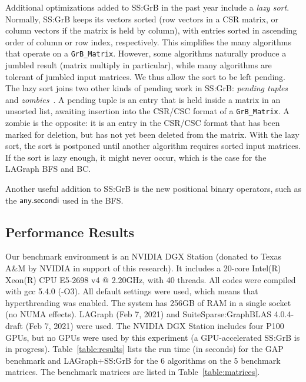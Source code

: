 Additional optimizations added to SS:GrB in the past year include a {\em lazy
sort}.  Normally, SS:GrB keeps its vectors sorted (row vectors in a CSR matrix,
or column vectors if the matrix is held by column), with entries sorted in
ascending order of column or row index, respectively.  This simplifies the many
algorithms that operate on a \verb'GrB_Matrix'.  However, some algorithms
naturally produce a jumbled result (matrix multiply in particular), while many
algorithms are tolerant of jumbled input matrices.  We thus allow the sort to
be left pending.  The lazy sort joins two other kinds of pending work in
SS:GrB: {\em pending tuples} and {\em zombies}~\cite{DBLP:journals/toms/Davis19}.
A pending tuple is an entry
that is held inside a matrix in an unsorted list, awaiting insertion into the
CSR/CSC format of a \verb'GrB_Matrix'.  A zombie is the opposite: it is an
entry in the CSR/CSC format that has been marked for deletion, but has not yet
been deleted from the matrix.  With the lazy sort, the sort is postponed until
another algorithm requires sorted input matrices.  If the sort is lazy enough,
it might never occur, which is the case for the LAGraph BFS and BC.

Another useful addition to SS:GrB is the new positional binary operators,
such as the $\mathbin{\mathsf{any.secondi}}$ %
used in the BFS.

\subsection{Performance Results}

Our benchmark environment is an NVIDIA DGX Station (donated to Texas A\&M by
NVIDIA in support of this research).  It includes a 20-core Intel(R) Xeon(R)
CPU E5-2698 v4 @ 2.20GHz, with 40 threads.  All codes were compiled with gcc
5.4.0 (-O3).  All default settings were used, which means that hyperthreading
was enabled.  The system has 256GB of RAM in a single socket (no NUMA effects).
LAGraph (Feb 7, 2021) and SuiteSparse:GraphBLAS 4.0.4-draft (Feb 7, 2021) were
used.  The NVIDIA DGX Station includes four P100 GPUs, but no GPUs were used by
this experiment (a GPU-accelerated SS:GrB is in progress).
Table~\ref{table:results} lists the run time (in seconds) for the GAP benchmark
and LAGraph+SS:GrB for the 6 algorithms on the 5 benchmark matrices.
The benchmark matrices are listed in Table~\ref{table:matrices}.


